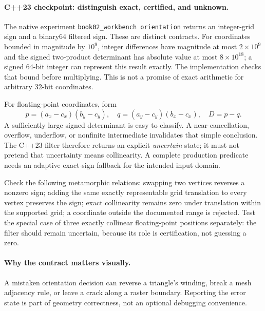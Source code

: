 \begin{booktwolab}
\paragraph{C++23 checkpoint: distinguish exact, certified, and unknown.}
The native experiment \texttt{book02\_workbench orientation} returns
an integer-grid sign and a binary64 filtered sign. These are distinct
contracts. For coordinates bounded in magnitude by \(10^9\), integer
differences have magnitude at most \(2\times10^9\) and the signed
two-product determinant has absolute value at most \(8\times10^{18}\);
a signed 64-bit integer can represent this result exactly. The
implementation checks that bound before multiplying. This is not
a promise of exact arithmetic for arbitrary 32-bit coordinates.

For floating-point coordinates, form
\[
 p=(a_x-c_x)(b_y-c_y),\quad
 q=(a_y-c_y)(b_x-c_x),\quad
 D=p-q.
\]
A sufficiently large signed determinant is easy to classify. A
near-cancellation, overflow, underflow, or nonfinite intermediate
invalidates that simple conclusion. The C++23 filter therefore
returns an explicit \emph{uncertain} state; it must not pretend that
uncertainty means collinearity. A complete production predicate needs
an adaptive exact-sign fallback for the intended input domain.

Check the following metamorphic relations: swapping two vertices
reverses a nonzero sign; adding the same exactly representable grid
translation to every vertex preserves the sign; exact collinearity
remains zero under translation within the supported grid; a coordinate
outside the documented range is rejected. Test the special case of
three exactly collinear floating-point positions separately: the
filter should remain uncertain, because its role is certification,
not guessing a zero.

\end{booktwolab}

\paragraph{Why the contract matters visually.}
A mistaken orientation decision can reverse a triangle's winding,
break a mesh adjacency rule, or leave a crack along a raster boundary.
Reporting the error state is part of geometry correctness, not an
optional debugging convenience.


